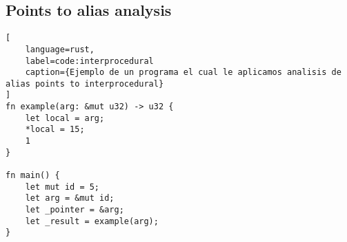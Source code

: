 \subsection{Points to alias analysis}

\begin{lstlisting}[
    language=rust,
    label=code:interprocedural
    caption={Ejemplo de un programa el cual le aplicamos analisis de alias points to interprocedural}
]
fn example(arg: &mut u32) -> u32 {
    let local = arg;
    *local = 15;
    1
}

fn main() {
    let mut id = 5;
    let arg = &mut id;
    let _pointer = &arg;
    let _result = example(arg);
}
\end{lstlisting}





